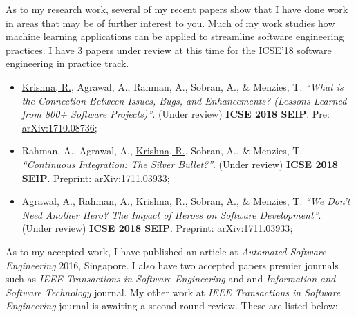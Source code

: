 \documentclass[11pt,letterpaper,sans]{moderncv}         \moderncvstyle{casual}
\begin{document}
As to my research work, several of my recent papers show that I have done work 
in areas that may be of further interest to you. Much of my work studies how 
machine learning applications can be applied to streamline software engineering 
practices. I have 3 papers 
under review at this time for the ICSE'18 software engineering in practice 
track.  \\[0.33cm]

\begin{itemize}
    \item\small \underline{Krishna, R.}, Agrawal, A., Rahman, A., Sobran, A., 
    \& Menzies, T. \textit{``What is the Connection Between Issues, Bugs, and 
    Enhancements? (Lessons Learned from 800+ Software Projects)''}. (Under 
    review) \textbf{ICSE 2018 SEIP}. Pre: 
    \href{https://arxiv.org/abs/1710.08736}{arXiv:1710.08736};\\[0.1cm]
    
    \item\small Rahman, A., Agrawal, A., \underline{Krishna, R.}, Sobran, A., 
    \& Menzies, T. \textit{``Continuous Integration: The Silver Bullet?''}. 
    (Under review)\textbf{ ICSE 2018 SEIP}. 
    Preprint: 
    \href{https://arxiv.org/abs/1711.03933}{arXiv:1711.03933};\\[0.1cm]
    \newpage
    \item\small Agrawal, A., Rahman, A., \underline{Krishna, R.}, Sobran, A., 
    \& Menzies, T. \textit{``We Don't Need Another Hero? The Impact of Heroes on Software Development''}. 
    (Under review)\textbf{ ICSE 2018 SEIP}. 
    Preprint: 
    \href{https://arxiv.org/abs/1711.03933}{arXiv:1711.03933};
\end{itemize}


As to my accepted work, I have published an article at \textit{Automated 
Software 
Engineering} 2016, Singapore. I also have two accepted papers premier journals 
such as \textit{IEEE Transactions in Software Engineering} and 
and \textit{Information and Software Technology} journal. My other work at 
\textit{IEEE Transactions in Software Engineering} 
journal is awaiting a second round 
review. These are listed below:\\[0.33cm]
\end{document}
